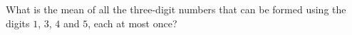 What is the mean of all the three-digit numbers that can be formed using the digits $1$, $3$, $4$ and $5$, each at most once?

